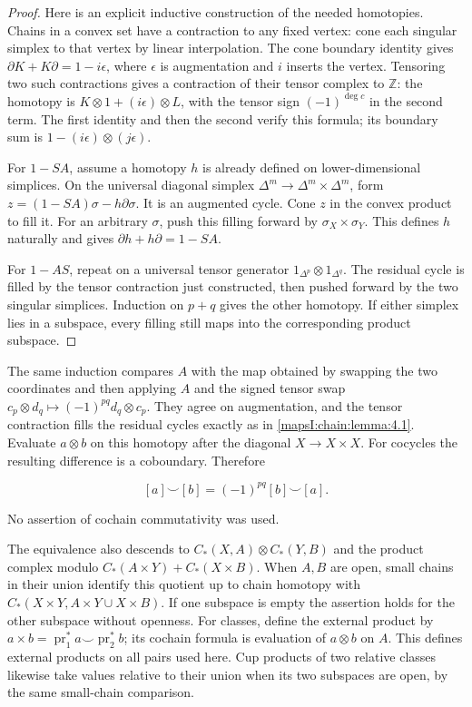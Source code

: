 \begin{proof}
Here is an explicit inductive construction of the needed homotopies. Chains in a convex set have a contraction to any fixed vertex: cone each singular simplex to that vertex by linear interpolation. The cone boundary identity gives \(\partial K+K\partial=1-i\epsilon\), where \(\epsilon\) is augmentation and \(i\) inserts the vertex. Tensoring two such contractions gives a contraction of their tensor complex to \(\mathbb Z\): the homotopy is \(K\otimes1+(i\epsilon)\otimes L\), with the tensor sign \((-1)^{\deg c}\) in the second term. The first identity and then the second verify this formula; its boundary sum is \(1-(i\epsilon)\otimes(j\epsilon)\).

For \(1-SA\), assume a homotopy \(h\) is already defined on lower-dimensional simplices. On the universal diagonal simplex \(\Delta^m\to\Delta^m\times\Delta^m\), form
\(z=(1-SA)\sigma-h\partial\sigma\).
It is an augmented cycle. Cone \(z\) in the convex product to fill it. For an arbitrary \(\sigma\), push this filling forward by \(\sigma_X\times\sigma_Y\). This defines \(h\) naturally and gives \(\partial h+h\partial=1-SA\).

For \(1-AS\), repeat on a universal tensor generator \(1_{\Delta^p}\otimes1_{\Delta^q}\). The residual cycle is filled by the tensor contraction just constructed, then pushed forward by the two singular simplices. Induction on \(p+q\) gives the other homotopy. If either simplex lies in a subspace, every filling still maps into the corresponding product subspace.
\end{proof}

The same induction compares \(A\) with the map obtained by swapping the two coordinates and then applying \(A\) and the signed tensor swap
\(c_p\otimes d_q\mapsto(-1)^{pq}d_q\otimes c_p\).
They agree on augmentation, and the tensor contraction fills the residual cycles exactly as in \cref{mapsI:chain:lemma:4.1}. Evaluate \(a\otimes b\) on this homotopy after the diagonal \(X\to X\times X\). For cocycles the resulting difference is a coboundary. Therefore

\[
[a]\smile[b]=(-1)^{pq}[b]\smile[a].
\]

No assertion of cochain commutativity was used.

The equivalence also descends to
\(C_*(X,A)\otimes C_*(Y,B)\) and the product complex modulo
\(C_*(A\times Y)+C_*(X\times B)\).
When \(A,B\) are open, small chains in their union identify this quotient up to chain homotopy with
\(C_*(X\times Y,A\times Y\cup X\times B)\).
If one subspace is empty the assertion holds for the other subspace without openness. For classes, define the external product by \(a\times b=\operatorname{pr}_1^*a\smile\operatorname{pr}_2^*b\); its cochain formula is evaluation of \(a\otimes b\) on \(A\). This defines external products on all pairs used here. Cup products of two relative classes likewise take values relative to their union when its two subspaces are open, by the same small-chain comparison.

